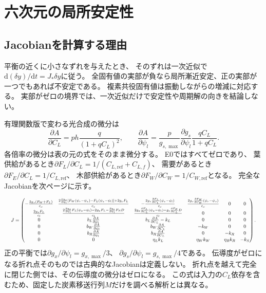\documentclass[a4paper,11pt]{ltjsarticle}
\newcommand{\dd}{\mathrm{d}}
\begin{document}
\section{六次元の局所安定性}
\subsection{Jacobianを計算する理由}
平衡の近くに小さなずれを与えたとき、
そのずれは一次近似で$\dd(\delta y)/\dd t=J_*\delta y$に従う。
全固有値の実部が負なら局所漸近安定、正の実部が一つでもあれば不安定である。
複素共役固有値は振動しながらの増減に対応する。
実部がゼロの境界では、一次近似だけで安定性や周期解の向きを結論しない。

有理関数版で変わる光合成の微分は
\begin{equation}
 \frac{\partial A}{\partial C_L}
   =p h\frac{q}{(1+qC_L)^2},\qquad
 \frac{\partial A}{\partial\psi_l}
   =\frac{p}{g_{s,\max}}\frac{\partial g_s}{\partial\psi_l}
                    \frac{qC_L}{1+qC_L}.
\end{equation}
各倍率の微分は表の元の式をそのまま微分する。
E0ではすべてゼロであり、
葉供給があるとき$\partial F_L/\partial C_L=1/(C_{L,\mathrm{ref}}+C_{L,f})$、
需要があるとき$\partial F_E/\partial C_L=1/C_{L,\mathrm{ref}}$、
木部供給があるとき$\partial F_W/\partial C_W=1/C_{W,\mathrm{ref}}$となる。
完全なJacobianを次ページに示す。

\begin{landscape}
\begin{equation}
\resizebox{.99\linewidth}{!}{$\displaystyle
J=
\begin{pmatrix}
 -\frac{2g_x(F_W+F_L)}{c_x}
 &\frac{2\frac{\partial g_x}{\partial\psi_l}
       [F_W(\psi_r-\psi_x)-F_L(\psi_x-\psi_l)]+2g_xF_L}{c_x}
 &-\frac{2g_x\frac{\partial F_L}{\partial C_L}(\psi_x-\psi_l)}{c_x}
 &\frac{2g_x\frac{\partial F_W}{\partial C_W}(\psi_r-\psi_x)}{c_x}&0&0\\
 \frac{2g_xF_L}{c_l}
 &\frac{2\frac{\partial g_x}{\partial\psi_l}F_L(\psi_x-\psi_l)-2g_xF_L
             -\frac{\partial g_s}{\partial\psi_l}F_ED}{c_l}
 &\frac{2g_x\frac{\partial F_L}{\partial C_L}(\psi_x-\psi_l)
                -g_s\frac{\partial F_E}{\partial C_L}D}{c_l}
 &0&0&0\\
 0&b_L\frac{\partial A}{\partial\psi_l}
   &b_L\frac{\partial A}{\partial C_L}-k_L&0&0&0\\
 0&b_W\frac{\partial A}{\partial\psi_l}
   &b_W\frac{\partial A}{\partial C_L}&-k_W&0&0\\
 0&b_R\frac{\partial A}{\partial\psi_l}
   &b_R\frac{\partial A}{\partial C_L}&0&-k_R&0\\
 0&0&\eta_Lk_L&\eta_Wk_W&\eta_Rk_R&-k_S
\end{pmatrix}.$}
\end{equation}
\noindent
正の平衡では$\partial g_x/\partial\psi_l=g_{x,\max}/3$、
$\partial g_s/\partial\psi_l=g_{s,\max}/4$である。
伝導度がゼロになる折れ点そのものでは古典的なJacobianは定義しない。
折れ点を越えて完全に閉じた側では、その伝導度の微分はゼロになる。
この式は入力の$C_L$依存を含むため、固定した炭素移送行列$M$だけを調べる解析とは異なる。
\end{landscape}
\end{document}
